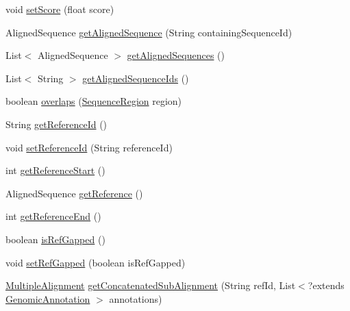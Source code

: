 \begin{DoxyCompactItemize}
\item 
void \hyperlink{classbroad_1_1core_1_1multiplealignment_1_1_multiple_alignment_ab136689f207d5f9d97a335fa1f119d1b}{set\+Score} (float score)
\item 
Aligned\+Sequence \hyperlink{classbroad_1_1core_1_1multiplealignment_1_1_multiple_alignment_a26518e06adc60b6632eda3cf6d5626be}{get\+Aligned\+Sequence} (String containing\+Sequence\+Id)
\item 
List$<$ Aligned\+Sequence $>$ \hyperlink{classbroad_1_1core_1_1multiplealignment_1_1_multiple_alignment_a9b23bea8a4c978acfe6f4a2202bc8f57}{get\+Aligned\+Sequences} ()
\item 
List$<$ String $>$ \hyperlink{classbroad_1_1core_1_1multiplealignment_1_1_multiple_alignment_a23b43077f9943897e9389ddc4f403d81}{get\+Aligned\+Sequence\+Ids} ()
\item 
boolean \hyperlink{classbroad_1_1core_1_1multiplealignment_1_1_multiple_alignment_a08a26221762f93b699be245c325b3c21}{overlaps} (\hyperlink{classbroad_1_1core_1_1sequence_1_1_sequence_region}{Sequence\+Region} region)
\item 
String \hyperlink{classbroad_1_1core_1_1multiplealignment_1_1_multiple_alignment_aae72327f5ed0497dd4c97e6a40c85b6a}{get\+Reference\+Id} ()
\item 
void \hyperlink{classbroad_1_1core_1_1multiplealignment_1_1_multiple_alignment_a8147ac5b5ea8641317588c5957006b19}{set\+Reference\+Id} (String reference\+Id)
\item 
int \hyperlink{classbroad_1_1core_1_1multiplealignment_1_1_multiple_alignment_aaff6f54d392c84a823118338da1aca1c}{get\+Reference\+Start} ()
\item 
Aligned\+Sequence \hyperlink{classbroad_1_1core_1_1multiplealignment_1_1_multiple_alignment_a56143bbb7c10c52fe379caf646baf3ec}{get\+Reference} ()
\item 
int \hyperlink{classbroad_1_1core_1_1multiplealignment_1_1_multiple_alignment_aadca4a586e660bfae64331b2f4448c30}{get\+Reference\+End} ()
\item 
boolean \hyperlink{classbroad_1_1core_1_1multiplealignment_1_1_multiple_alignment_a8bbb7981b4e9286756b65a983b8ec7a1}{is\+Ref\+Gapped} ()
\item 
void \hyperlink{classbroad_1_1core_1_1multiplealignment_1_1_multiple_alignment_abec1f2b36b5b61d36491db003ad702cf}{set\+Ref\+Gapped} (boolean is\+Ref\+Gapped)
\item 
\hyperlink{classbroad_1_1core_1_1multiplealignment_1_1_multiple_alignment}{Multiple\+Alignment} \hyperlink{classbroad_1_1core_1_1multiplealignment_1_1_multiple_alignment_aca6da10d461c82b32cf2fcc585e17a37}{get\+Concatenated\+Sub\+Alignment} (String ref\+Id, List$<$?extends \hyperlink{interfacebroad_1_1core_1_1annotation_1_1_genomic_annotation}{Genomic\+Annotation} $>$ annotations)

\end{DoxyCompactItemize}
